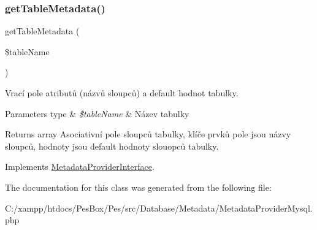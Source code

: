 \subsubsection{\texorpdfstring{get\+Table\+Metadata()}{getTableMetadata()}}
{\footnotesize\ttfamily get\+Table\+Metadata (\begin{DoxyParamCaption}\item[{}]{\$table\+Name }\end{DoxyParamCaption})}

Vrací pole atributů (názvů sloupců) a default hodnot tabulky. 
\begin{DoxyParams}[1]{Parameters}
type & {\em \$table\+Name} & Název tabulky \\
\hline
\end{DoxyParams}
\begin{DoxyReturn}{Returns}
array Asociativní pole sloupců tabulky, klíče prvků pole jsou názvy sloupců, hodnoty jsou default hodnoty slouopců tabulky. 
\end{DoxyReturn}


Implements \mbox{\hyperlink{interface_pes_1_1_database_1_1_metadata_1_1_metadata_provider_interface}{Metadata\+Provider\+Interface}}.



The documentation for this class was generated from the following file\+:\begin{DoxyCompactItemize}
\item 
C\+:/xampp/htdocs/\+Pes\+Box/\+Pes/src/\+Database/\+Metadata/Metadata\+Provider\+Mysql.\+php\end{DoxyCompactItemize}
